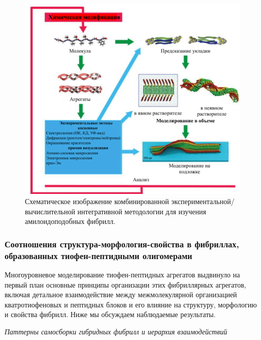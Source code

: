 \begin{figure} [H]
    \centering
    \includegraphics[width=\textwidth]{images/p4/punkt5/part4_p5_f54.pdf}
    \caption[Схематическое изображение комбинированной экспериментальной/вычислительной интегративной методологии для изучения амилоидоподобных фибрилл]{Схематическое изображение комбинированной экспериментальной/вычислительной интегративной методологии для изучения амилоидоподобных фибрилл.}
    \label{fig:p4_p5_f54}
\end{figure}
    
    
\subsubsection{Соотношения структура-морфология-свойства в фибриллах, образованных тиофен-пептидными олигомерами}
    
    Многоуровневое моделирование тиофен-пептидных агрегатов выдвинуло на первый план основные принципы организации этих фибриллярных агрегатов, включая детальное взаимодействие между межмолекулярной организацией кватротиофеновых и пептидных блоков и его влияние на структуру, морфологию и свойства фибрилл. Ниже мы обсуждаем наблюдаемые результаты.
    
    \emph{Паттерны самосборки гибридных фибрилл и иерархия взаимодействий}
    
